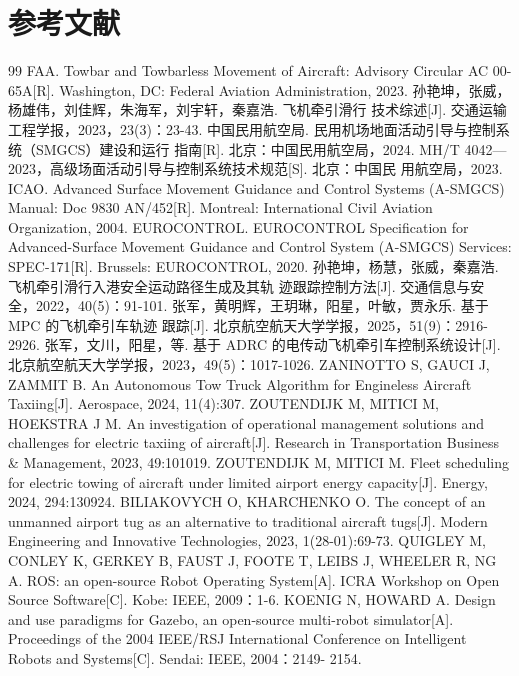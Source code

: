 \section*{参考文献}
\begin{thebibliography}{99}
 FAA. Towbar and Towbarless Movement of Aircraft: Advisory Circular AC 00- 65A[R]. Washington, DC: Federal Aviation Administration, 2023.
 孙艳坤，张威，杨雄伟，刘佳辉，朱海军，刘宇轩，秦嘉浩. 飞机牵引滑行 技术综述[J]. 交通运输工程学报，2023，23(3)：23-43.
 中国民用航空局. 民用机场地面活动引导与控制系统（SMGCS）建设和运行 指南[R]. 北京：中国民用航空局，2024.
 MH/T 4042—2023，高级场面活动引导与控制系统技术规范[S]. 北京：中国民 用航空局，2023.
 ICAO. Advanced Surface Movement Guidance and Control Systems (A-SMGCS) Manual: Doc 9830 AN/452[R]. Montreal: International Civil Aviation Organization, 2004.
 EUROCONTROL. EUROCONTROL Specification for Advanced-Surface Movement Guidance and Control System (A-SMGCS) Services: SPEC-171[R]. Brussels: EUROCONTROL, 2020.
 孙艳坤，杨慧，张威，秦嘉浩. 飞机牵引滑行入港安全运动路径生成及其轨 迹跟踪控制方法[J]. 交通信息与安全，2022，40(5)：91-101.
 张军，黄明辉，王玥琳，阳星，叶敏，贾永乐. 基于 MPC 的飞机牵引车轨迹 跟踪[J]. 北京航空航天大学学报，2025，51(9)：2916-2926.
 张军，文川，阳星，等. 基于 ADRC 的电传动飞机牵引车控制系统设计[J]. 北京航空航天大学学报，2023，49(5)：1017-1026.
 ZANINOTTO S, GAUCI J, ZAMMIT B. An Autonomous Tow Truck Algorithm for Engineless Aircraft Taxiing[J]. Aerospace, 2024, 11(4):307.
 ZOUTENDIJK M, MITICI M, HOEKSTRA J M. An investigation of operational management solutions and challenges for electric taxiing of aircraft[J]. Research in Transportation Business \& Management, 2023, 49:101019.
 ZOUTENDIJK M, MITICI M. Fleet scheduling for electric towing of aircraft under limited airport energy capacity[J]. Energy, 2024, 294:130924.
 BILIAKOVYCH O, KHARCHENKO O. The concept of an unmanned airport tug as an alternative to traditional aircraft tugs[J]. Modern Engineering and Innovative Technologies, 2023, 1(28-01):69-73.
 QUIGLEY M, CONLEY K, GERKEY B, FAUST J, FOOTE T, LEIBS J, WHEELER R, NG A. ROS: an open-source Robot Operating System[A]. ICRA Workshop on Open Source Software[C]. Kobe: IEEE, 2009：1-6.
 KOENIG N, HOWARD A. Design and use paradigms for Gazebo, an open-source multi-robot simulator[A]. Proceedings of the 2004 IEEE/RSJ International Conference on Intelligent Robots and Systems[C]. Sendai: IEEE, 2004：2149- 2154.

\end{thebibliography}
